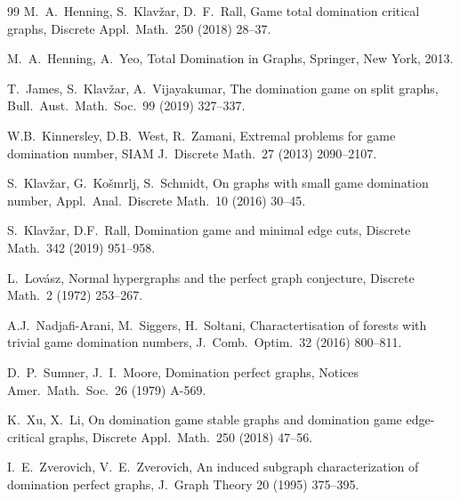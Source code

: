 \documentclass[12pt]{article}
\begin{document}
\begin{thebibliography}{99}
  M.~A.~Henning, S.~Klav{\v{z}}ar, D.~F.~Rall,
  Game total domination critical graphs,
  Discrete Appl.\ Math.\ 250 (2018) 28--37.
  
M.~A.~Henning, A.~Yeo,
Total Domination in Graphs,
Springer, New York, 2013.
    
  T.~James, S.~Klav\v{z}ar, A.~Vijayakumar,
  The domination game on split graphs, 
  Bull.\ Aust.\ Math.\ Soc.\ 99 (2019) 327--337. 
  
  W.B.~Kinnersley, D.B.~West, R.~Zamani,
  Extremal problems for game domination number,
  SIAM J.\ Discrete Math.\ 27 (2013) 2090--2107.	

  S.~Klav\v{z}ar,  G.~Ko\v smrlj, S.~Schmidt,
  On graphs with small game domination number,
  Appl.\ Anal.\ Discrete Math.\ 10 (2016) 30--45.

  S.~Klav\v{z}ar, D.F.~Rall,
  Domination game and minimal edge cuts,
  Discrete Math.\ 342 (2019) 951--958.

  L.~Lov\'{a}sz,
  Normal hypergraphs and the perfect graph conjecture,
  Discrete Math.\ 2 (1972) 253--267.

  A.J.~Nadjafi-Arani, M.~Siggers, H.~Soltani,
  Charactertisation of forests with trivial game domination numbers,
  J.\ Comb.\ Optim.\ 32 (2016) 800--811.
  
  D.~P.~Sumner, J.~I.~Moore, 
  Domination perfect graphs, 
  Notices Amer.\ Math.\ Soc.\ 26 (1979) A-569.

  K.~Xu, X.~Li, 
  On domination game stable graphs and domination game edge-critical graphs,
  Discrete Appl.\ Math.\ 250 (2018) 47--56.

  I.~E.~Zverovich, V.~E.~Zverovich, 
  An induced subgraph characterization of domination perfect graphs, 
  J.\ Graph Theory 20 (1995) 375--395.
  
\end{thebibliography}
\end{document}
